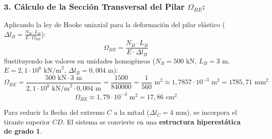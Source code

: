 \subsubsection*{3. Cálculo de la Sección Transversal del Pilar $\Omega_{BE}$:}
Aplicando la ley de Hooke uniaxial para la deformación del pilar elástico ($\Delta l_B = \frac{N_B \cdot L_B}{E \cdot \Omega_{BE}}$):
\begin{equation}
    \Omega_{BE} = \frac{N_B \cdot L_B}{E \cdot \Delta l_B}
\end{equation}
Sustituyendo los valores en unidades homogéneas ($N_B = 500\text{ kN}$, $L_B = 3\text{ m}$, $E = 2{,}1 \cdot 10^8\text{ kN/m}^2$, $\Delta l_B = 0{,}004\text{ m}$):
\begin{equation}
    \Omega_{BE} = \frac{500\text{ kN} \cdot 3\text{ m}}{2{,}1 \cdot 10^8\text{ kN/m}^2 \cdot 0{,}004\text{ m}} = \frac{1500}{840000} = \frac{1}{560}\text{ m}^2 \approx \boxed{1{,}7857 \cdot 10^{-3}\text{ m}^2 = 1785{,}71\text{ mm}^2}
\end{equation}
\begin{equation}
    \boxed{\Omega_{BE} \approx 1{,}79 \cdot 10^{-3}\text{ m}^2 = 17{,}86\text{ cm}^2}
\end{equation}


Para reducir la flecha del extremo $C$ a la mitad ($\Delta l_C = 4\text{ mm}$), se incorpora el tirante superior $CD$. El sistema se convierte en una \textbf{estructura hiperestática de grado 1}.

